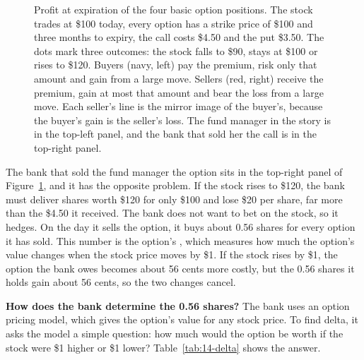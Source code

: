 \begin{figure}[htbp]
\caption{Profit at expiration of the four basic option positions. The stock trades at \$100 today, every option has a strike price of \$100 and three months to expiry, the call costs \$4.50 and the put \$3.50. The dots mark three outcomes: the stock falls to \$90, stays at \$100 or rises to \$120. Buyers (navy, left) pay the premium, risk only that amount and gain from a large move. Sellers (red, right) receive the premium, gain at most that amount and bear the loss from a large move. Each seller's line is the mirror image of the buyer's, because the buyer's gain is the seller's loss. The fund manager in the story is in the top-left panel, and the bank that sold her the call is in the top-right panel.}
\label{fig:14-four-payoffs}
\end{figure}

The bank that sold the fund manager the option sits in the top-right panel of Figure~\ref{fig:14-four-payoffs}, and it has the opposite problem. If the stock rises to \$120, the bank must deliver shares worth \$120 for only \$100 and lose \$20 per share, far more than the \$4.50 it received. The bank does not want to bet on the stock, so it hedges. On the day it sells the option, it buys about 0.56 shares for every option it has sold. This number is the option's , which measures how much the option's value changes when the stock price moves by \$1. If the stock rises by \$1, the option the bank owes becomes about 56 cents more costly, but the 0.56 shares it holds gain about 56 cents, so the two changes cancel.

\textbf{How does the bank determine the 0.56 shares?} The bank uses an option pricing model, which gives the option's value for any stock price. To find delta, it asks the model a simple question: how much would the option be worth if the stock were \$1 higher or \$1 lower? Table~\ref{tab:14-delta} shows the answer.

